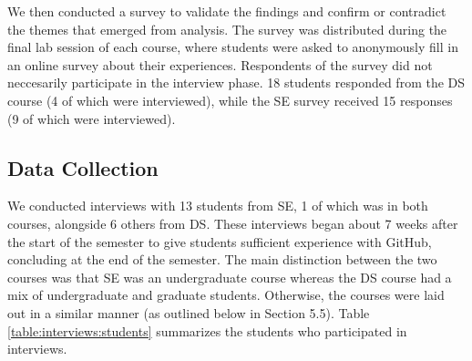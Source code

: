 We then conducted a survey to validate the findings and confirm or contradict the themes that emerged from analysis. The survey was distributed during the final lab session of each course, where students were asked to anonymously fill in an online survey about their experiences. Respondents of the survey did not neccesarily participate in the interview phase. 18 students responded from the DS course (4 of which were interviewed), while the SE survey received 15 responses (9 of which were interviewed).

\subsection{Data Collection}
We conducted interviews with 13 students from SE, 1 of which was in both courses, alongside 6 others from DS. These interviews began about 7 weeks after the start of the semester to give students sufficient experience with GitHub, concluding at the end of the semester. The main distinction between the two courses was that SE was an undergraduate course whereas the DS course had a mix of undergraduate and graduate students. Otherwise, the courses were laid out in a similar manner (as outlined below in Section 5.5). Table \ref{table:interviews:students} summarizes the students who participated in interviews.

